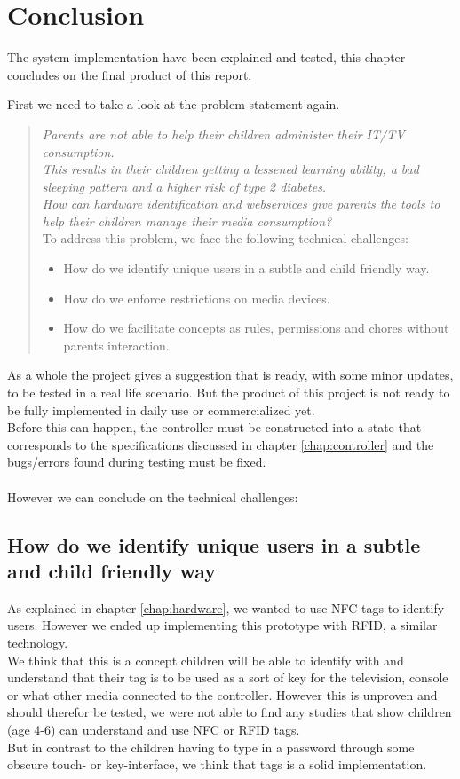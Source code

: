 \chapter{Conclusion}
The system implementation have been explained and tested, this chapter concludes on the final product of this report.

First we need to take a look at the problem statement again.
\begin{verse}
\textit{Parents are not able to help their children administer their IT/TV consumption.\\
This results in their children getting a lessened learning ability, a bad sleeping pattern and a higher risk of type 2 diabetes.\\
How can hardware identification and webservices give parents the tools to help their children manage their media consumption?}\\
To address this problem, we face the following technical challenges:
	\begin{itemize}
		\item How do we identify unique users in a subtle and child friendly way.
		\item How do we enforce restrictions on media devices.
		\item How do we facilitate concepts as rules, permissions and chores without parents interaction.
	\end{itemize}
\end{verse}

As a whole the project gives a suggestion that is ready, with some minor updates, to be tested in a real life scenario. But the product of this project is not ready to be fully implemented in daily use or commercialized yet.\\
Before this can happen, the controller must be constructed into a state that corresponds to the specifications discussed in chapter \vref{chap:controller} and the bugs/errors found during testing must be fixed.\\
\\
However we can conclude on the technical challenges:

\section*{How do we identify unique users in a subtle and child friendly way}
As explained in chapter \vref{chap:hardware}, we wanted to use NFC tags to identify users. However we ended up implementing this prototype with RFID, a similar technology.\\
We think that this is a concept children will be able to identify with and understand that their tag is to be used as a sort of key for the television, console or what other media connected to the controller. However this is unproven and should therefor be tested, we were not able to find any studies that show children (age 4-6) can understand and use NFC or RFID tags.\\
But in contrast to the children having to type in a password through some obscure touch- or key-interface, we think that tags is a solid implementation.

